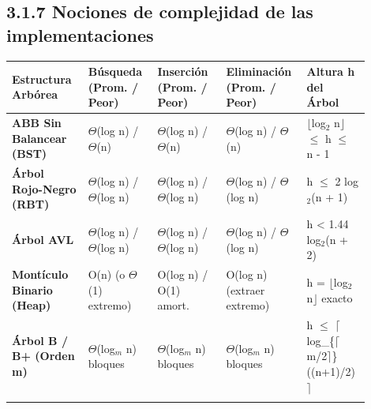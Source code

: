 \documentclass[11pt,letterpaper]{article}
\begin{document}
\subsection*{3.1.7 Nociones de complejidad de las implementaciones}
\vspace{4pt}\noindent
\begin{tabular}{>{\raggedright\arraybackslash}p{0.208\linewidth}>{\raggedright\arraybackslash}p{0.180\linewidth}>{\raggedright\arraybackslash}p{0.180\linewidth}>{\raggedright\arraybackslash}p{0.180\linewidth}>{\raggedright\arraybackslash}p{0.152\linewidth}}
\toprule
\textbf{\color{ipnguinda}Estructura Arbórea} & \textbf{\color{ipnguinda}Búsqueda (Prom. / Peor)} & \textbf{\color{ipnguinda}Inserción (Prom. / Peor)} & \textbf{\color{ipnguinda}Eliminación (Prom. / Peor)} & \textbf{\color{ipnguinda}Altura h del Árbol} \\
\midrule
\textbf{ABB Sin Balancear (BST)} & $\Theta$(log n) / $\Theta$(n) & $\Theta$(log n) / $\Theta$(n) & $\Theta$(log n) / $\Theta$(n) & $\lfloor$log$_2$ n$\rfloor$ $\le$ h $\le$ n - 1 \\
\addlinespace[3pt]
\textbf{Árbol Rojo-Negro (RBT)} & $\Theta$(log n) / $\Theta$(log n) & $\Theta$(log n) / $\Theta$(log n) & $\Theta$(log n) / $\Theta$(log n) & h $\le$ 2 log$_2$(n + 1) \\
\addlinespace[3pt]
\textbf{Árbol AVL} & $\Theta$(log n) / $\Theta$(log n) & $\Theta$(log n) / $\Theta$(log n) & $\Theta$(log n) / $\Theta$(log n) & h < 1.44 log$_2$(n + 2) \\
\addlinespace[3pt]
\textbf{Montículo Binario (Heap)} & O(n) (o $\Theta$(1) extremo) & O(log n) / O(1) amort. & O(log n) (extraer extremo) & h = $\lfloor$log$_2$ n$\rfloor$ exacto \\
\addlinespace[3pt]
\textbf{Árbol B / B+ (Orden m)} & $\Theta$(log$_m$ n) bloques & $\Theta$(log$_m$ n) bloques & $\Theta$(log$_m$ n) bloques & h $\le$ $\lceil$log\_\{$\lceil$m/2$\rceil$\}((n+1)/2)$\rceil$ \\
\addlinespace[3pt]
\bottomrule
\end{tabular}
\vspace{6pt}\par
\end{document}
